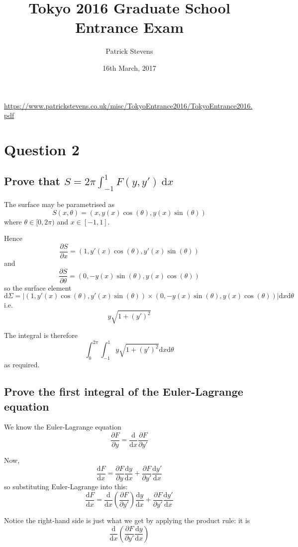 \documentclass[11pt]{amsart}
\title{Tokyo 2016 Graduate School Entrance Exam}
\author{Patrick Stevens}
\date{16th March, 2017}
\begin{document}
\maketitle

\tiny \begin{center} \url{https://www.patrickstevens.co.uk/misc/TokyoEntrance2016/TokyoEntrance2016.pdf} \end{center}
\normalsize

\section{Question 2}
\subsection{Prove \texorpdfstring{that $S = 2\pi \int_{-1}^1 F(y, y') \ \mathrm{d}x$}{a certain integral form for S}}
The surface may be parametrised as $$S(x, \theta) = (x, y(x) \cos(\theta), y(x) \sin(\theta))$$
where $\theta \in [0, 2\pi)$ and $x \in [-1,1]$.

Hence $$\dfrac{\partial S}{\partial x} = (1, y'(x) \cos(\theta), y'(x) \sin(\theta))$$ and $$\dfrac{\partial S}{\partial \theta} = (0, -y(x) \sin(\theta), y(x) \cos(\theta))$$
so the surface element $$\mathrm{d}\Sigma = \left| \left(1, y'(x) \cos(\theta), y'(x) \sin(\theta) \right) \times (0, -y(x) \sin(\theta), y(x) \cos(\theta)) \right| \mathrm{d}x \mathrm{d}\theta$$
i.e. $$y \sqrt{1+(y')^2}$$

The integral is therefore $$\int_{0}^{2 \pi} \int_{-1}^1 y \sqrt{1+(y')^2} \mathrm{d}x \mathrm{d}\theta$$
as required.

\subsection{Prove the first integral of the Euler-Lagrange equation}
We know the Euler-Lagrange equation $$\dfrac{\partial F}{\partial y} = \dfrac{\mathrm{d}}{\mathrm{d}x} \dfrac{\partial F}{\partial y'}$$

Now, $$\frac{\mathrm{d}F}{\mathrm{d}{x}} = \dfrac{\partial F}{\partial y} \dfrac{\mathrm{d}y}{\mathrm{d}x} + \dfrac{\partial F}{\partial y'} \dfrac{\mathrm{d}y'}{\mathrm{d}x}$$
so substituting Euler-Lagrange into this:
$$\frac{\mathrm{d}F}{\mathrm{d}{x}} = \dfrac{\mathrm{d}}{\mathrm{d}x} \left(\dfrac{\partial F}{\partial y'}\right) \dfrac{\mathrm{d}y}{\mathrm{d}x} + \dfrac{\partial F}{\partial y'} \dfrac{\mathrm{d}y'}{\mathrm{d}x}$$

Notice the right-hand side is just what we get by applying the product rule: it is $$\dfrac{\mathrm{d}}{\mathrm{d}x} \left( \dfrac{\partial F}{\partial y'} \dfrac{\mathrm{d}y}{\mathrm{d}x} \right)$$
\end{document}
